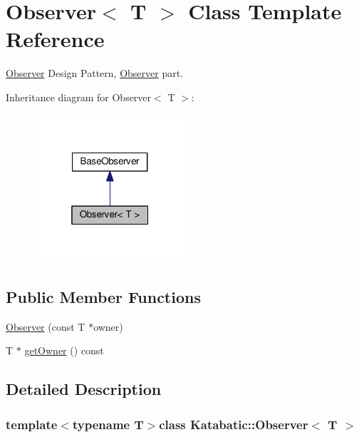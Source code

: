\hypertarget{classKatabatic_1_1Observer}{\section{Observer$<$ T $>$ Class Template Reference}
\label{classKatabatic_1_1Observer}
}


\hyperlink{classKatabatic_1_1Observer}{Observer} Design Pattern, \hyperlink{classKatabatic_1_1Observer}{Observer} part.  




Inheritance diagram for Observer$<$ T $>$\-:\nopagebreak
\begin{figure}[H]
\begin{center}
\leavevmode
\includegraphics[width=160pt]{classKatabatic_1_1Observer__inherit__graph}
\end{center}
\end{figure}
\subsection*{Public Member Functions}
\begin{DoxyCompactItemize}
\item 
\hyperlink{classKatabatic_1_1Observer_ab05ec12517c51952960dd4f324499b44}{Observer} (const T $\ast$owner)
\item 
T $\ast$ \hyperlink{classKatabatic_1_1Observer_a1515e4d637164e6589f550164c304fe1}{get\-Owner} () const 
\end{DoxyCompactItemize}


\subsection{Detailed Description}
\subsubsection*{template$<$typename T$>$class Katabatic\-::\-Observer$<$ T $>$}

